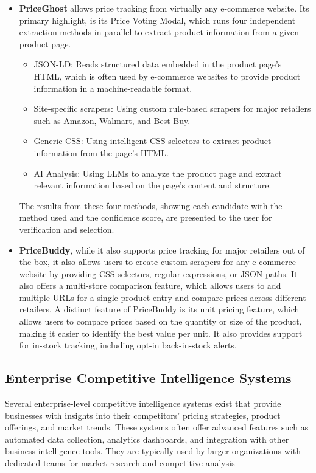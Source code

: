 \begin{itemize}
    \item \textbf{PriceGhost} allows price tracking from virtually any e-commerce website.
    Its primary highlight, is its Price Voting Modal, which runs four independent extraction methods in parallel to extract product information from a given product page.\cite{priceghost_github}
    \begin{itemize}
        \item JSON-LD: Reads structured data embedded in the product page's HTML, which is often used by e-commerce websites to provide product information in a machine-readable format.
        \item Site-specific scrapers: Using custom rule-based scrapers for major retailers such as Amazon, Walmart, and Best Buy.
        \item Generic CSS: Using intelligent CSS selectors to extract product information from the page's HTML.
        \item AI Analysis: Using LLMs to analyze the product page and extract relevant information based on the page's content and structure.
    \end{itemize}
    The results from these four methods, showing each candidate with the method used and the confidence score, are presented to the user for verification and selection.

    \item \textbf{PriceBuddy}, while it also supports price tracking for major retailers out of the box, it also allows users to create custom scrapers for any e-commerce website
    by providing CSS selectors, regular expressions, or JSON paths.
    It also offers a multi-store comparison feature, which allows users to add multiple URLs for a single product entry and compare prices across different retailers.
    A distinct feature of PriceBuddy is its unit pricing feature, which allows users to compare prices based on the quantity or size of the product, making it easier to identify the best value per unit.
    It also provides support for in-stock tracking, including opt-in back-in-stock alerts.\cite{pricebuddy_github}
\end{itemize}

\subsection{Enterprise Competitive Intelligence Systems}\label{sec:related_work_enterprise_systems}
Several enterprise-level competitive intelligence systems exist that provide businesses with insights into their competitors' pricing strategies,
product offerings, and market trends.
These systems often offer advanced features such as automated data collection, analytics dashboards, and integration with other business intelligence tools.
They are typically used by larger organizations with dedicated teams for market research and competitive analysis

